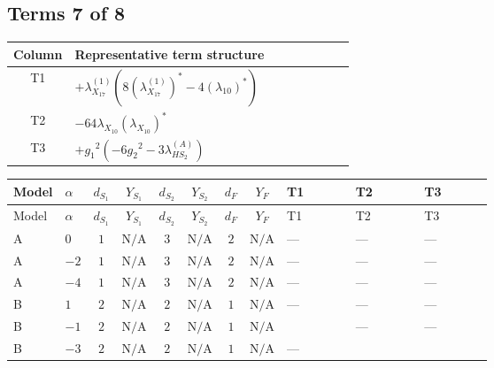 \documentclass[8pt]{article}
\begin{document}
\begin{landscape}
\subsection*{Terms 7 of 8}
\begin{center}
\begin{tabular}{@{}c >{\raggedright\arraybackslash}p{0.82\linewidth}@{}}
\toprule
Column & Representative term structure \\
\midrule
T1 & \(\displaystyle +{\lambda_{X_{17}}^{(1)}} (8 \left({\lambda_{X_{17}}^{(1)}}\right)^{*}-4 \left({\lambda_{10}}\right)^{*})\) \\
\midrule
T2 & \(\displaystyle -64 {\lambda_{X_{10}}} \left({\lambda_{X_{10}}}\right)^{*}\) \\
\midrule
T3 & \(\displaystyle +{g_1}^2 \left(-6 {g_2}^2-3 {\lambda_{HS_2}^{(A)}}\right)\) \\
\midrule
\bottomrule
\end{tabular}
\end{center}
\smallskip
\tiny
\begin{longtable}{@{}llcccccc >{\raggedright\arraybackslash}p{0.21\linewidth} >{\raggedright\arraybackslash}p{0.21\linewidth} >{\raggedright\arraybackslash}p{0.21\linewidth}@{}}
\toprule
Model & $\alpha$ & $d_{S_1}$ & $Y_{S_1}$ & $d_{S_2}$ & $Y_{S_2}$ & $d_F$ & $Y_F$ & T1 & T2 & T3 \\
\midrule
\endfirsthead
\toprule
Model & $\alpha$ & $d_{S_1}$ & $Y_{S_1}$ & $d_{S_2}$ & $Y_{S_2}$ & $d_F$ & $Y_F$ & T1 & T2 & T3 \\
\midrule
\endhead
A & $0$ & $1$ & $\text{N/A}$ & $3$ & $\text{N/A}$ & $2$ & $\text{N/A}$ & --- & --- & --- \\
\midrule
A & $-2$ & $1$ & $\text{N/A}$ & $3$ & $\text{N/A}$ & $2$ & $\text{N/A}$ & --- & --- & --- \\
\midrule
A & $-4$ & $1$ & $\text{N/A}$ & $3$ & $\text{N/A}$ & $2$ & $\text{N/A}$ & --- & --- & --- \\
\midrule
B & $1$ & $2$ & $\text{N/A}$ & $2$ & $\text{N/A}$ & $1$ & $\text{N/A}$ & --- & --- & --- \\
\midrule
B & $-1$ & $2$ & $\text{N/A}$ & $2$ & $\text{N/A}$ & $1$ & $\text{N/A}$ & \scriptsize\adjustbox{max width=\linewidth}{$\begin{gathered} +{\lambda_{X_{17}}^{(1)}} (8 \left({\lambda_{X_{17}}^{(1)}}\right)^{*}-4 \left({\lambda_{10}}\right)^{*})\end{gathered}$} & --- & --- \\
\midrule
B & $-3$ & $2$ & $\text{N/A}$ & $2$ & $\text{N/A}$ & $1$ & $\text{N/A}$ & --- & \scriptsize\adjustbox{max width=\linewidth}{$\begin{gathered} -64 {\lambda_{X_{10}}} \left({\lambda_{X_{10}}}\right)^{*}\end{gathered}$} & \scriptsize\adjustbox{max width=\linewidth}{$\begin{gathered} +{g_1}^2 \left(-6 {g_2}^2-3 {\lambda_{HS_2}^{(A)}}\right)\end{gathered}$} \\

\end{longtable}
\end{landscape}
\end{document}
